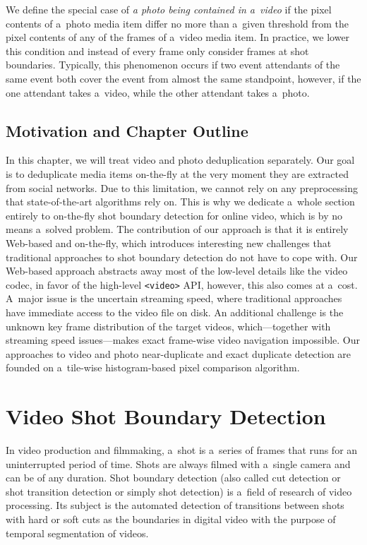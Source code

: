 We define the special case of
\emph{a photo being contained in a~video} if the pixel contents
of a~photo media item differ no more than a~given threshold from
the pixel contents of any of the frames of a~video media item.
In practice, we lower this condition and instead of every frame
only consider frames at shot boundaries.
Typically, this phenomenon occurs if two event attendants
of the same event both cover the event from almost the same
standpoint, however, if the one attendant takes a~video,
while the other attendant takes a~photo.

\subsection{Motivation and Chapter Outline}

In this chapter, we will treat video
and photo deduplication separately. 
Our goal is to deduplicate media items on-the-fly
at the very moment they are extracted from social networks.
Due to this limitation, we cannot rely on any preprocessing
that state-of-the-art algorithms rely on.
This is why we dedicate a~whole section entirely to on-the-fly
shot boundary detection for online video,
which is by no means a~solved problem.
The contribution of our approach is that it is entirely Web-based
and on-the-fly, which introduces interesting new challenges
that traditional approaches to shot boundary detection
do not have to cope with.
Our Web-based approach abstracts away most of the low-level details
like the video codec, in favor of the high-level \texttt{<video>}
API, however, this also comes at a~cost.
A~major issue is the uncertain streaming speed,
where traditional approaches have immediate access
to the video file on disk.
An additional challenge is the unknown key frame distribution
of the target videos, which---together with streaming speed
issues---makes exact frame-wise video navigation impossible.
Our approaches to video and photo near-duplicate
and exact duplicate detection are founded
on a~tile-wise histogram-based pixel comparison algorithm.

\section{Video Shot Boundary Detection} \label{sec:videoshotboundarydetection}
In video production and filmmaking, a~shot is a~series of frames
that runs for an uninterrupted period of time.
Shots are always filmed with a~single camera and can be of any duration. 
Shot boundary detection (also called cut detection or shot transition detection
or simply shot detection) is a~field of research of video processing.
Its subject is the automated detection of transitions between shots
with hard or soft cuts as the boundaries
in digital video with the purpose of temporal segmentation of videos.

